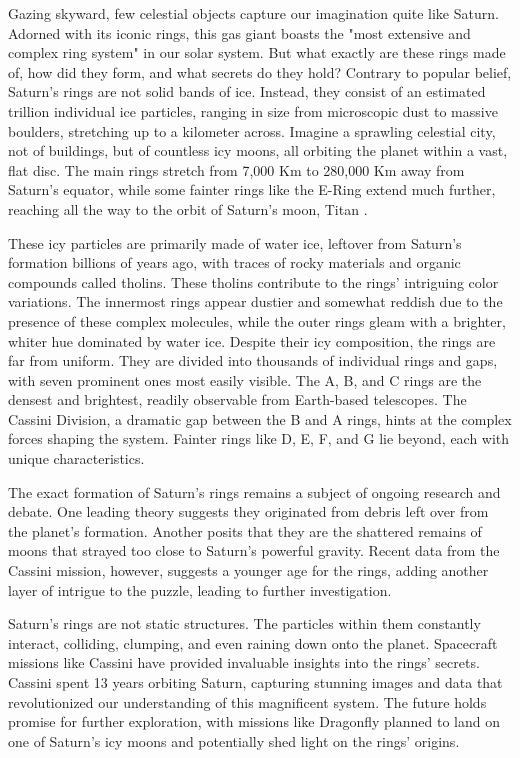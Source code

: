 \documentclass{article}
\begin{document}
Gazing skyward, few celestial objects capture our imagination quite like Saturn. Adorned with its iconic rings, this gas giant boasts the "most extensive and complex ring system" in our solar system. But what exactly are these rings made of, how did they form, and what secrets do they hold? Contrary to popular belief, Saturn's rings are not solid bands of ice. Instead, they consist of an estimated trillion individual ice particles, ranging in size from microscopic dust to massive boulders, stretching up to a kilometer across. Imagine a sprawling celestial city, not of buildings, but of countless icy moons, all orbiting the planet within a vast, flat disc. The main rings stretch from 7,000 Km to 280,000 Km away from Saturn's equator, while some fainter rings like the E-Ring extend much further, reaching all the way to the orbit of Saturn's moon, Titan \cite{enwiki:1201721965}.

These icy particles are primarily made of water ice, leftover from Saturn's formation billions of years ago, with traces of rocky materials and organic compounds called tholins\cite{NASA_Saturn}. These tholins contribute to the rings' intriguing color variations. The innermost rings appear dustier and somewhat reddish due to the presence of these complex molecules, while the outer rings gleam with a brighter, whiter hue dominated by water ice\cite{Britannica_Saturn}. Despite their icy composition, the rings are far from uniform. They are divided into thousands of individual rings and gaps, with seven prominent ones most easily visible. The A, B, and C rings are the densest and brightest, readily observable from Earth-based telescopes\cite{NASA_Saturn}. The Cassini Division, a dramatic gap between the B and A rings, hints at the complex forces shaping the system. Fainter rings like D, E, F, and G lie beyond, each with unique characteristics\cite{Britannica_Saturn}.

The exact formation of Saturn's rings remains a subject of ongoing research and debate. One leading theory suggests they originated from debris left over from the planet's formation\cite{enwiki:1201721965}. Another posits that they are the shattered remains of moons that strayed too close to Saturn's powerful gravity\cite{Britannica_Saturn}. Recent data from the Cassini mission, however, suggests a younger age for the rings, adding another layer of intrigue to the puzzle, leading to further investigation.

Saturn's rings are not static structures. The particles within them constantly interact, colliding, clumping, and even raining down onto the planet\cite{NASA_Saturn}. Spacecraft missions like Cassini have provided invaluable insights into the rings' secrets. Cassini spent 13 years orbiting Saturn, capturing stunning images and data that revolutionized our understanding of this magnificent system\cite{JPL_Cassini}. The future holds promise for further exploration, with missions like Dragonfly planned to land on one of Saturn's icy moons and potentially shed light on the rings' origins\cite{NASA_Dragonfly}.
\end{document}
